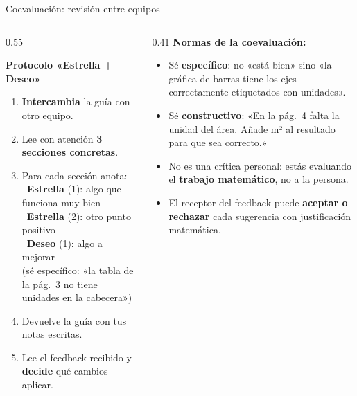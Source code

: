 \documentclass[aspectratio=169, 10pt, spanish]{beamer}
\begin{document}
\begin{frame}{Coevaluación: revisión entre equipos}
  \begin{columns}[c]
    \begin{column}{0.55\textwidth}
      \begin{teoriabox}
        \textbf{Protocolo «Estrella + Deseo»}\\[6pt]
        \begin{enumerate}
          \item \textbf{Intercambia} la guía con otro equipo.
          \item Lee con atención \textbf{3 secciones concretas}.
          \item Para cada sección anota:\\[4pt]
            \fastar\ \textbf{Estrella} (1): algo que funciona muy bien\\
            \fastar\ \textbf{Estrella} (2): otro punto positivo\\
            \faCommentAlt\ \textbf{Deseo} (1): algo a mejorar\\
            (sé específico: «la tabla de la pág.~3
            no tiene unidades en la cabecera»)
          \item Devuelve la guía con tus notas escritas.
          \item Lee el feedback recibido y \textbf{decide}
                qué cambios aplicar.
        \end{enumerate}
      \end{teoriabox}
    \end{column}
    \begin{column}{0.41\textwidth}
      \textbf{Normas de la coevaluación:}
      \begin{itemize}
        \item Sé \textbf{específico}: no «está bien» sino
              «la gráfica de barras tiene los ejes
              correctamente etiquetados con unidades».
        \item Sé \textbf{constructivo}: «En la pág.~4 falta
              la unidad del área. Añade m² al resultado
              para que sea correcto.»
        \item No es una crítica personal: estás
              evaluando el \textbf{trabajo matemático},
              no a la persona.
        \item El receptor del feedback puede
              \textbf{aceptar o rechazar} cada sugerencia
              con justificación matemática.
      \end{itemize}
    \end{column}
  \end{columns}
\end{frame}
\end{document}
